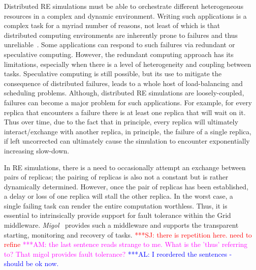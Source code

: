 \documentclass[conference,final]{IEEEtran}
\newcommand{\alnote}[1]{ {\textcolor{blue} { ***AL: #1 }}}
\newcommand{\amnote}[1]{ {\textcolor{magenta} { ***AM: #1 }}}
\newcommand{\jhanote}[1]{ {\textcolor{red} { ***SJ: #1 }}}
\newcommand{\alnote}[1]{}
\newcommand{\amnote}[1]{}
\newcommand{\jhanote}[1]{}
\begin{document}


Distributed RE simulations must be able to orchestrate different
heterogeneous resources in a complex and dynamic environment.  Writing
such applications is a complex task for a myriad number of reasons,
not least of which is that distributed computing environments are
inherently prone to failures and thus
unreliable~\cite{schroeder,10.1109/E-SCIENCE.2006.93,DBLP:conf/grid/KhaliliHOSC06}.
Some applications can respond to such failures via redundant or
speculative computing.  However, the redundant computing approach has
its limitations, especially when there is a level of heterogeneity and
coupling between tasks.  Speculative computing is still possible, but
its use to mitigate the consequence of distributed failures, leads to
a whole host of load-balancing and scheduling problems. Although,
distributed RE simulations are loosely-coupled, failures can become a
major problem for such applications. For example, for every replica
that encounters a failure there is at least one replica that will wait
on it. Thus over time, due to the fact that in principle, every
replica will ultimately interact/exchange with another replica, in
principle, the failure of a single replica, if left uncorrected can
ultimately cause the simulation to encounter exponentially increasing
slow-down.


In RE simulations, there is a need to occasionally attempt an exchange
between pairs of replicas; the pairing of replicas is also not a
constant but is rather dynamically determined. However, once the pair
of replicas has been established, a delay or loss of one replica will
stall the other replica. In the worst case, a single failing task can
render the entire computation worthless.  Thus, it is essential to
intrinsically provide support for fault tolerance within the Grid
middleware.  \emph{Migol}~\cite{schnorLuckow08} provides such a
middleware and supports
the transparent starting, monitoring and recovery of tasks.  
\jhanote{there is repetition here. need to refine} \amnote{the last
  sentence reads strange to me.  What is the 'thus' referring to?  That
  migol provides fault tolerance?}      
\alnote{I reordered the sentences - should be ok now.}
\end{document}
